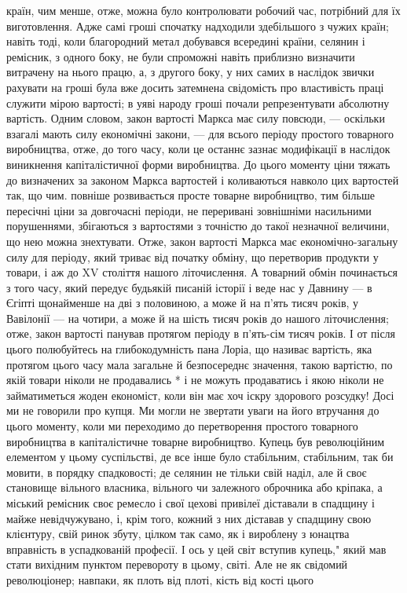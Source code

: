 \parcont{}  %
країн, чим менше, отже, можна було контролювати робочий час, потрібний для їх виготовлення. Адже самі гроші спочатку
надходили здебільшого з чужих країн; навіть тоді, коли благородний метал добувався всередині країни, селянин і ремісник, з
одного боку, не були спроможні навіть приблизно визначити витрачену на нього працю, а, з другого боку, у них самих в
наслідок звички рахувати на гроші була вже досить затемнена свідомість про властивість праці служити мірою вартості;  в уяві
народу гроші почали репрезентувати абсолютну вартість. Одним словом, закон вартості Маркса має силу повсюди, —  оскільки
взагалі мають силу економічні закони, — для всього періоду простого товарного виробництва, отже, до того часу, коли це
останнє зазнає модифікації в наслідок виникнення капіталістичної форми виробництва. До цього моменту ціни тяжать до
визначених за законом Маркса вартостей і коливаються навколо цих вартостей так, що чим. повніше розвивається просте товарне
виробництво, тим більше пересічні ціни за довгочасні періоди, не переривані зовнішніми насильними порушеннями, збігаються з
вартостями з точністю до такої незначної величини, що нею можна знехтувати. Отже, закон вартості Маркса має
економічно-загальну силу для періоду, який триває від початку обміну, що перетворив продукти у товари, і аж до XV століття
нашого літочислення. А товарний обмін починається з того часу, який передує будьякій писаній історії і веде нас у Давнину —
в Єгіпті щонайменше на дві з половиною, а може й на п’ять тисяч років, у Вавілонії — на чотири, а може й на шість тисяч
років до нашого літочислення; отже, закон вартості панував протягом періоду в п’ять-сім тисяч років. І от після цього
полюбуйтесь на глибокодумність пана Лоріа, що називає вартість, яка протягом цього часу мала загальне й безпосереднє
значення, такою вартістю, по якій товари ніколи не продавались *  і не можуть продаватись і якою ніколи не займатиметься
жоден
економіст, коли він має хоч іскру здорового розсудку! Досі ми не говорили про купця. Ми могли не звертати уваги на його
втручання до цього моменту, коли ми переходимо до перетворення простого товарного виробництва в капіталістичне товарне
виробництво. Купець був революційним елементом у цьому суспільстві, де все інше було стабільним, стабільним, так би мовити,
в порядку спадковості; де селянин не тільки свій наділ, але й своє становище вільного власника, вільного чи залежного
оброчника або кріпака, а міський ремісник своє ремесло і свої цехові привілеї діставали в спадщину і майже невідчужувано, і,
крім того, кожний з них діставав у спадщину свою клієнтуру, свій ринок збуту, цілком так само, як і вироблену з юнацтва
вправність в успадкованій професії. І ось у цей світ вступив купець," який мав стати вихідним пунктом перевороту в цьому,
світі. Але не як свідомий революціонер; навпаки, як плоть від плоті, кість від кості цього
\parbreak{}  %
